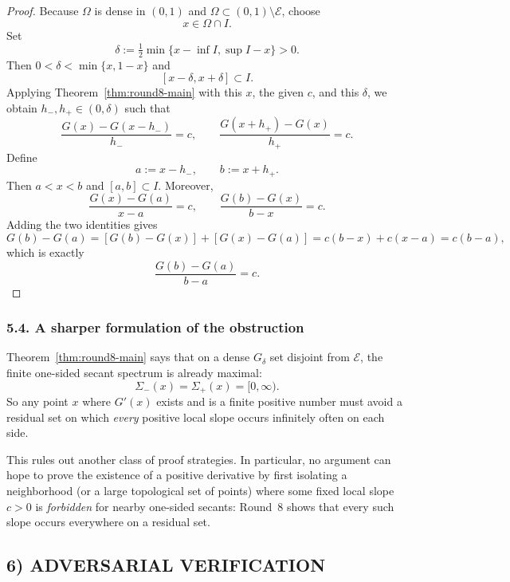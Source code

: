 \begin{proof}
Because $\Omega$ is dense in $(0,1)$ and $\Omega\subset(0,1)\setminus\mathcal E$, choose
\[
x\in\Omega\cap I.
\]
Set
\[
\delta:=\tfrac12\min\{x-\inf I,\sup I-x\}>0.
\]
Then $0<\delta<\min\{x,1-x\}$ and
\[
[x-\delta,x+\delta]\subset I.
\]
Applying Theorem~\ref{thm:round8-main} with this $x$, the given $c$, and this $\delta$, we obtain $h_-,h_+\in(0,\delta)$ such that
\[
\frac{G(x)-G(x-h_-)}{h_-}=c,
\qquad
\frac{G(x+h_+)-G(x)}{h_+}=c.
\]
Define
\[
a:=x-h_-,\qquad b:=x+h_+.
\]
Then $a<x<b$ and $[a,b]\subset I$. Moreover,
\[
\frac{G(x)-G(a)}{x-a}=c,
\qquad
\frac{G(b)-G(x)}{b-x}=c.
\]
Adding the two identities gives
\[
G(b)-G(a)=[G(b)-G(x)]+[G(x)-G(a)]
=c(b-x)+c(x-a)=c(b-a),
\]
which is exactly
\[
\frac{G(b)-G(a)}{b-a}=c.
\]
\end{proof}

\subsubsection*{5.4. A sharper formulation of the obstruction}

Theorem~\ref{thm:round8-main} says that on a dense $G_\delta$ set disjoint from $\mathcal E$, the finite one-sided secant spectrum is already maximal:
\[
\Sigma_-(x)=\Sigma_+(x)=[0,\infty).
\]
So any point $x$ where $G'(x)$ exists and is a finite positive number must avoid a residual set on which \emph{every} positive local slope occurs infinitely often on each side.

This rules out another class of proof strategies. In particular, no argument can hope to prove the existence of a positive derivative by first isolating a neighborhood (or a large topological set of points) where some fixed local slope $c>0$ is \emph{forbidden} for nearby one-sided secants: Round~8 shows that every such slope occurs everywhere on a residual set.

\subsection{6) ADVERSARIAL VERIFICATION}


